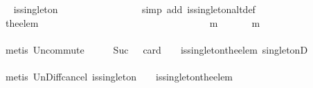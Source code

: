 \begin{isabellebody}
\ \isamarkupfalse%
\ {\isachardoublequoteopen}is{\isacharunderscore}singleton\ {\isacharparenleft}{\isasymsigma}\ {\isacharminus}\ {\isasymsigma}{\isacharprime}{\isacharparenright}{\isachardoublequoteclose}\isanewline
\ \ \ \ \ \ \ \ \ \ \ \ \isamarkupfalse%
\ {\isacharparenleft}simp\ add{\isacharcolon}\ is{\isacharunderscore}singleton{\isacharunderscore}altdef{\isacharparenright}\isanewline
\ \ \ \ \ \ \ \ \ \ \isamarkupfalse%
\ \isamarkupfalse%
\ {\isachardoublequoteopen}{\isacharbraceleft}the{\isacharunderscore}elem\ {\isacharparenleft}{\isasymsigma}\ {\isacharminus}\ {\isasymsigma}{\isacharprime}{\isacharparenright}{\isacharbraceright}\ {\isasymunion}\ {\isasymsigma}{\isacharprime}\ {\isasymin}\ {\isasymSigma}{\isachardoublequoteclose}\isanewline
\ \ \ \ \ \ \ \ \ \ \ \ \isamarkupfalse%
\ {\isacartoucheopen}{\isasymforall}\ {\isasymsigma}\ {\isasymin}\ {\isasymSigma}{\isachardot}\ {\isasymforall}\ {\isasymsigma}{\isacharprime}\ {\isasymin}\ {\isasymSigma}{\isachardot}\ {\isasymnot}\ {\isasymsigma}\ {\isasymsubseteq}\ {\isasymsigma}{\isacharprime}\ {\isasymlongrightarrow}\ {\isacharparenleft}{\isasymexists}\ m\ {\isasymin}\ {\isasymsigma}\ {\isacharminus}\ {\isasymsigma}{\isacharprime}{\isachardot}\ {\isasymsigma}{\isacharprime}\ {\isasymunion}\ {\isacharbraceleft}m{\isacharbraceright}\ {\isasymin}\ {\isasymSigma}{\isacharparenright}{\isacartoucheclose}\ {\isacartoucheopen}{\isasymsigma}\ {\isasymin}\ {\isasymSigma}{\isacartoucheclose}\ {\isacartoucheopen}{\isasymsigma}{\isacharprime}\ {\isasymin}\ {\isasymSigma}{\isacartoucheclose}\isanewline
\ \ \ \ \ \ \ \ \ \ \ \ \isamarkupfalse%
\ {\isacharparenleft}metis\ Un{\isacharunderscore}commute\ {\isacartoucheopen}{\isasymnot}\ {\isasymsigma}\ {\isasymsubseteq}\ {\isasymsigma}{\isacharprime}\ {\isasymand}\ Suc\ {}\ {\isacharequal}\ card\ {\isacharparenleft}{\isasymsigma}\ {\isacharminus}\ {\isasymsigma}{\isacharprime}{\isacharparenright}{\isacartoucheclose}\ is{\isacharunderscore}singleton{\isacharunderscore}the{\isacharunderscore}elem\ singletonD{\isacharparenright}\isanewline
\ \ \ \ \ \ \ \ \ \ \isamarkupfalse%
\ \isamarkupfalse%
\ {\isachardoublequoteopen}{\isasymsigma}\ {\isasymunion}\ {\isasymsigma}{\isacharprime}\ {\isasymin}\ {\isasymSigma}{\isachardoublequoteclose}\isanewline
\ \ \ \ \ \ \ \ \ \ \ \ \isamarkupfalse%
\ {\isacharparenleft}metis\ Un{\isacharunderscore}Diff{\isacharunderscore}cancel{}\ {\isacartoucheopen}is{\isacharunderscore}singleton\ {\isacharparenleft}{\isasymsigma}\ {\isacharminus}\ {\isasymsigma}{\isacharprime}{\isacharparenright}{\isacartoucheclose}\ is{\isacharunderscore}singleton{\isacharunderscore}the{\isacharunderscore}elem{\isacharparenright}\ \ \ \isanewline

\end{isabellebody}
